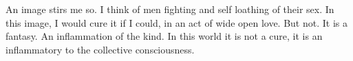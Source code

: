 

An image stirs me so.  I think of men fighting and self loathing of
their sex.  In this image, I would cure it if I could, in an act of
wide open love.  But not.  It is a fantasy.  An inflammation of the
kind.  In this world it is not a cure, it is an inflammatory to the
collective consciousness.

\bye
